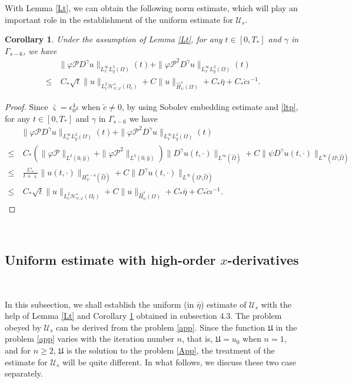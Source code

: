 \documentclass{amsart}
\numberwithin{equation}{section}
\newtheorem{corollary}{Corollary}[section]
\begin{document}
With Lemma \ref{Lt}, we can obtain the following norm estimate, which will play an important role in the establishment of the uniform estimate for $\mathcal{U}_{s}$.
\begin{corollary}\label{Ltc}
Under the assumption of Lemma \ref{Lt}, for any $t\in[0,T_{*}]$ and $\gamma$ in $\Gamma_{s-6}$, we have
\begin{align}
&\|\varphi\mathcal{P}D^{\gamma}u\|_{L_{x}^{\infty}L_{y}^{2}(\Omega)}(t)+\|\varphi \mathcal{P}^{2}D^{\gamma}u\|_{L_{x}^{\infty}L_{y}^{2}(\Omega)}(t)\\
\leq&~C_{*}\sqrt{t}\|u\|_{L_{t}^{2}\mathcal{H}_{\psi,\varphi}^{s}(\Omega_{t})}
     +C\|u\|_{\hat{H}_{\psi}^{s}(\Omega)}
     +C_{*}\bar{\eta}
     +C_{*}\check{c}\iota^{-1}.\nonumber
\end{align}
\end{corollary}
\begin{proof}
Since $\bar{\varsigma}=\epsilon_{0}^{4}\iota$ when $\check{c}\neq0$, by using Sobolev embedding estimate and \eqref{ltp}, for any $t\in[0,T_{*}]$ and $\gamma$ in $\Gamma_{s-6}$ we have
\begin{align*}
&\|\varphi\mathcal{P}D^{\gamma}u\|_{L_{x}^{\infty}L_{y}^{2}(\Omega)}(t)
+\|\varphi\mathcal{P}^{2}D^{\gamma}u\|_{L_{x}^{\infty}L_{y}^{2}(\Omega)}(t)\\
\leq&~C_{*}\left(\|\varphi\mathcal{P}\|_{L^{2}(0,\hat{y})}+\|\varphi\mathcal{P}^{2}\|_{L^{2}(0,\hat{y})}\right)
          \|D^{\gamma}u(t,\cdot)\|_{L^{\infty}(\hat{\Omega})}
     +C\|\psi D^{\gamma}u(t,\cdot)\|_{L^{\infty}(\Omega\setminus\hat{\Omega})}\\
\leq&~\frac{C_{*}}{t+\bar{\varsigma}}\|u(t,\cdot)\|_{H_{\psi}^{s-4}(\hat{\Omega})}
     +C\|D^{\gamma}u(t,\cdot)\|_{L^{\infty}(\Omega\setminus\hat{\Omega})}\\
\leq&~C_{*}\sqrt{t}\|u\|_{L_{t}^{2}\mathcal{H}_{\psi,\varphi}^{s}(\Omega_{t})}
     +C\|u\|_{\hat{H}_{\psi}^{s}(\Omega)}
     +C_{*}\bar{\eta}
     +C_{*}\check{c}\iota^{-1}.
\end{align*}
\end{proof}
~~~~~~~~~~

\subsection{Uniform estimate with high-order $x$-derivatives}~

In this subsection, we shall establish the uniform (in $\bar{\eta}$) estimate of $\mathcal{U}_{s}$ with the help of Lemma \ref{Lt} and Corollary \ref{Ltc} obtained in subsection 4.3. The problem obeyed by $\mathcal{U}_{s}$ can be derived from the problem \eqref{app}. Since the function $\mathfrak{U}$ in the problem \eqref{app} varies with the iteration number $n$, that is, $\mathfrak{U}=u_{0}$ when $n=1$, and  for $n\geq 2$,  $\mathfrak{U}$ is the solution to the problem \eqref{App}, the treatment of the estimate for $\mathcal{U}_{s}$ will be quite different. In what follows, we discuss these two case separately.
\end{document}

